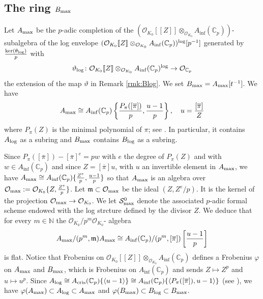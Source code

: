 \documentclass[asterisque,english]{smfart}
\begin{document}
\subsection{The ring $B_{\rm max}$}
Let $A_{\rm max}$ be the  $p$-adic completion of the $(\mathcal{O}_{K_0}[\![Z]\!] \otimes_{\mathcal{O}_{K_0}} A_{\mathrm{inf}}(\mathbb{C}_p))$-subalgebra of the log envelope $(\mathcal{O}_{K_0}[\![Z]\!] \otimes_{\mathcal{O}_{K_0}} A_{\mathrm{inf}}(\mathbb{C}_p))^{\rm log}[p^{-1}]$ generated by $\frac{\mathrm{ker}(\theta_{\rm log})}{p}$ with 
$$\vartheta_{\rm log} \colon \mathcal{O}_{K_0}[\![Z]\!] \otimes_{\mathcal{O}_{K_0}} A_{\mathrm{inf}}(\mathbb{C}_p)^{\rm log} \to \mathcal{O}_{\mathbb{C}_p}$$the extension of the map $\vartheta$ in Remark \ref{rmk:Blog}. We set $B_{\rm max}=A_{\rm max}[t^{-1}]$. We have $$A_{\rm max}\cong A_{\mathrm{inf}}(\mathbb{C}_p) 
\left\{\frac{P_\pi([\overline{\pi}])}{p},\frac{u-1}{p}\right\}, \quad u=\frac{[\overline{\pi}]}{Z}$$where $P_\pi(Z)$ is  the minimal polynomial of $\pi$; see \cite[Lemma 3.23]{AI}.  In particular, it contains $A_ {\rm log}$ as a subring and $B_{\rm max}$ contains $B_{\rm log}$ as a subring.





Since $P_\pi([\overline{\pi}])-[\overline{\pi}]^e=p w$ with $e$ the degree of $P_\pi(Z)$ and with $w\in A_{\mathrm{inf}}(\mathbb{C}_p)$ and since $Z=[\overline{\pi}] u$, with $u$ an invertible element in $A_{\rm max}$, we have $A_{\rm max}\cong A_{\mathrm{inf}}(\mathbb{C}_p)\{\frac{Z^e}{p},\frac{u-1}{p}\}$ so that $A_{\rm max}$  is an algebra over $\mathcal{O}_{\rm max}:=\mathcal{O}_{K_0}\{Z,\frac{Z^e}{p}\}$. Let $\mathfrak{m}\subset \mathcal{O}_{\rm max}$ be the ideal $(Z, Z^e/p)$. It is the kernel of the projection $\mathcal{O}_{\rm max}\to \mathcal{O}_{K_0}$. We let $\mathcal{S}_{\rm max}^0$ denote the associated $p$-adic formal scheme endowed with the log strcture defined by the divisor $Z$.  We deduce that for every $m\in \mathbb{N}$ the $\mathcal{O}_{K_0}/p^m \mathcal{O}_{K_0}$- algebra $$A_{\rm max}/(p^m,\mathfrak{m}) A_{\rm max}\cong  A_{\mathrm{inf}}(\mathbb{C}_p)/(p^m,[\overline{\pi}]) \left[\frac{u-1}{p}\right]$$is flat. Notice that Frobenius on $\mathcal{O}_{K_0}[\![Z]\!] \otimes_{\mathcal{O}_{K_0}} A_{\mathrm{inf}}(\mathbb{C}_p)$ defines a Frobenius $\varphi$ on  $A_{\rm max}$ and $B_{\rm max}$, which is Frobenius on  $A_{\mathrm{inf}}(\mathbb{C}_p)$ and sends $Z\mapsto Z^p$ and $u\mapsto u^p$. Since $A_{\rm log}\cong A_{\mathrm{cris}}(\mathbb{C}_p)\{\langle u-1\rangle \}\cong A_{\mathrm{inf}}(\mathbb{C}_p)\{\langle P_\pi([\overline{\pi}]), u-1\rangle \}$ (see \cite[\S 2.1.1]{AI}), we have $\varphi(A_{\rm max})\subset A_{\rm log}\subset A_{\rm max}$ and $\varphi(B_{\rm max})\subset B_{\rm log}\subset B_{\rm max}$.
\end{document}
